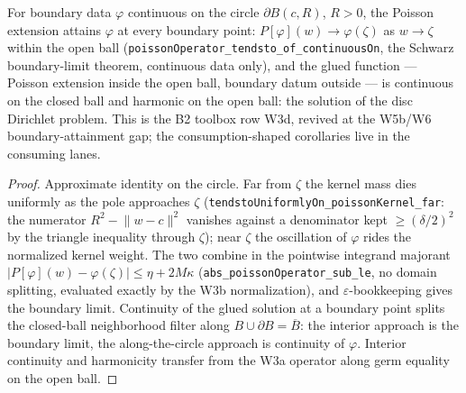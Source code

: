 \begin{lemma}
\label{lem:perron-poisson-boundary-limit}
For boundary data \(\varphi\) continuous on the circle
\(\partial B(c, R)\), \(R > 0\), the Poisson extension attains
\(\varphi\) at every boundary point: \(P[\varphi](w) \to \varphi(\zeta)\)
as \(w \to \zeta\) within the open ball
(\texttt{poissonOperator\_tendsto\_of\_continuousOn}, the Schwarz
boundary-limit theorem, continuous data only), and the glued function —
Poisson extension inside the open ball, boundary datum outside — is
continuous on the closed ball and harmonic on the open ball: the
solution of the disc Dirichlet problem.  This is the B2 toolbox row
W3d, revived at the W5b/W6 boundary-attainment gap; the
consumption-shaped corollaries live in the consuming lanes.
\leanok
\end{lemma}
\begin{proof}\leanok
Approximate identity on the circle.  Far from \(\zeta\) the kernel mass
dies uniformly as the pole approaches \(\zeta\)
(\texttt{tendstoUniformlyOn\_poissonKernel\_far}: the numerator
\(R^2 - \lVert w - c\rVert^2\) vanishes against a denominator kept
\(\ge (\delta/2)^2\) by the triangle inequality through \(\zeta\));
near \(\zeta\) the oscillation of \(\varphi\) rides the normalized
kernel weight.  The two combine in the pointwise integrand majorant
\(|P[\varphi](w) - \varphi(\zeta)| \le \eta + 2M\kappa\)
(\texttt{abs\_poissonOperator\_sub\_le}, no domain splitting, evaluated
exactly by the W3b normalization), and \(\varepsilon\)-bookkeeping
gives the boundary limit.  Continuity of the glued solution at a
boundary point splits the closed-ball neighborhood filter along
\(B \cup \partial B = \overline{B}\): the interior approach is the
boundary limit, the along-the-circle approach is continuity of
\(\varphi\).  Interior continuity and harmonicity transfer from the
W3a operator along germ equality on the open ball.
\end{proof}

